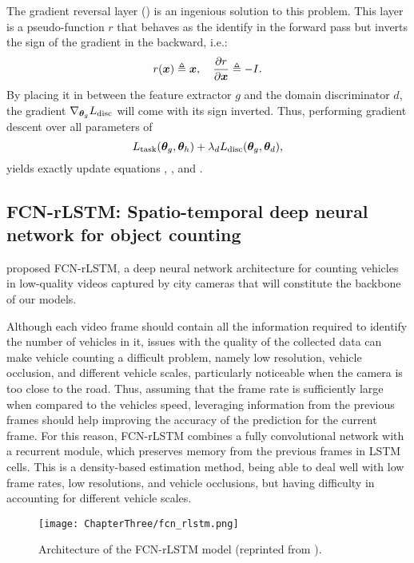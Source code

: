 The gradient reversal layer (\citet{Ganin2015}) is an ingenious solution to this problem. This layer is a pseudo-function $r$ that behaves as the identify in the forward pass but inverts the sign of the gradient in the backward, i.e.:
\begin{equation}
	r({\bm{x}}) \triangleq {\bm{x}}, \quad \frac{\partial r}{\partial {\bm{x}}} \triangleq -I.
\end{equation}
By placing it in between the feature extractor $g$ and the domain discriminator $d$, the gradient $\nabla_{{\bm{\theta}}_g} L_{\text{disc}}$ will come with its sign inverted. Thus, performing gradient descent over all parameters of
\begin{equation}
	L_{\text{task}}({\bm{\theta}}_g, {\bm{\theta}}_h) + \lambda_d L_{\text{disc}}({\bm{\theta}}_g, {\bm{\theta}}_d),
\end{equation}
yields exactly update equations , , and .

\subsection{FCN-rLSTM: Spatio-temporal deep neural network for object counting}
\label{sec:da_sensors_fcn_rltsm}

\citet{Zhang2017} proposed FCN-rLSTM, a deep neural network architecture for counting vehicles in low-quality videos captured by city cameras that will constitute the backbone of our models. 

Although each video frame should contain all the information required to identify the number of vehicles in it, issues with the quality of the collected data can make vehicle counting a difficult problem, namely low resolution, vehicle occlusion, and different vehicle scales, particularly noticeable when the camera is too close to the road. Thus, assuming that the frame rate is sufficiently large when compared to the vehicles speed, leveraging information from the previous frames should help improving the accuracy of the prediction for the current frame. For this reason, FCN-rLSTM combines a fully convolutional network with a recurrent module, which preserves memory from the previous frames in LSTM cells. This is a density-based estimation method, being able to deal well with low frame rates, low resolutions, and vehicle occlusions, but having difficulty in accounting for different vehicle scales.

\begin{figure}
	\centering
	\texttt{[image: ChapterThree/fcn\_rlstm.png]}
	\caption{Architecture of the FCN-rLSTM model (reprinted from \citet{Zhang2017}).}
	\label{fig:fcn_rlstm}
\end{figure}

